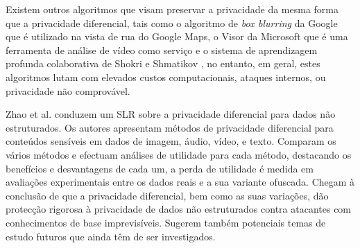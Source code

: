 \documentclass[conference]{IEEEtran}
\begin{document}

Existem outros algoritmos que visam preservar a privacidade da mesma forma
que a privacidade diferencial, tais como o algoritmo de \textit{box blurring}
da Google \cite{FromeLarge} que é utilizado na vista de rua do Google Maps,
o Visor da Microsoft \cite{poddar2020visor} que é uma ferramenta de análise
de vídeo como serviço e o sistema de aprendizagem profunda colaborativa de
Shokri e Shmatikov \cite{ShokriPrivacy}, no entanto, em geral, estes algoritmos
lutam com elevados custos computacionais, ataques internos, ou privacidade
não comprovável.


Zhao et al. \cite{ZhaoSurvey} conduzem um SLR sobre a privacidade diferencial
para dados não estruturados. Os autores apresentam métodos de privacidade
diferencial para conteúdos sensíveis em dados de imagem, áudio, vídeo, e texto.
Comparam os vários métodos e efectuam análises de utilidade para cada método,
destacando os benefícios e desvantagens de cada um, a perda de utilidade é
medida em avaliações experimentais entre os dados reais e a sua variante ofuscada.
Chegam à conclusão de que a privacidade diferencial, bem como as suas variações,
dão protecção rigorosa à privacidade de dados não estruturados contra atacantes
com conhecimentos de base imprevisíveis. Sugerem também potenciais temas de
estudo futuros que ainda têm de ser investigados.

\end{document}
